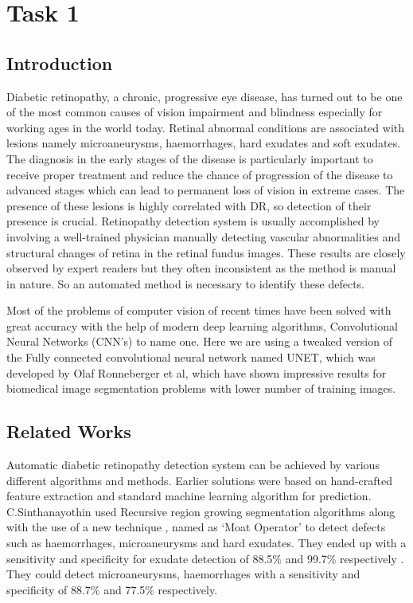 \documentclass[conference]{IEEEtran}
\begin{document}
\section{Task 1}

\subsection{Introduction}
\par
Diabetic retinopathy, a chronic, progressive eye disease, has turned out to be one of the most common causes of vision impairment and blindness especially for working ages in the world today\cite{1}. Retinal abnormal conditions are associated with lesions namely microaneurysms, haemorrhages, hard exudates and soft exudates. The diagnosis in the early stages of the disease is particularly important to receive proper treatment and reduce the chance of progression of the disease to advanced stages which can lead to permanent loss of vision in extreme cases\cite{2}. The presence of these lesions is highly correlated with DR, so detection of their presence is crucial. Retinopathy detection system is usually accomplished by involving a well-trained physician manually detecting vascular abnormalities and structural changes of retina in the retinal fundus images. These results are closely observed by expert readers but they often inconsistent as the method is manual in nature\cite{8}. So an automated method is necessary to identify these defects. 
\par
Most of the problems of computer vision of recent times have been solved with great accuracy with the help of modern deep learning algorithms, Convolutional Neural Networks (CNN's) to name one. Here we are using a tweaked version of the Fully connected convolutional neural network named UNET, which was developed by Olaf Ronneberger et al\cite{unet}, which have shown impressive results for biomedical image segmentation problems with lower number of training images.

\subsection{Related Works}
\par

Automatic diabetic retinopathy detection system can be achieved by various different algorithms and methods. Earlier solutions were based on hand-crafted feature extraction and standard machine learning algorithm for prediction\cite{3}. C.Sinthanayothin used Recursive region growing segmentation algorithms along with the use of a new technique , named as ‘Moat Operator’ to detect defects such as haemorrhages, microaneurysms and hard exudates. They ended up with a sensitivity and specificity for exudate detection of 88.5\% and 99.7\% respectively . They could detect microaneurysms, haemorrhages with a sensitivity and specificity of 88.7\% and 77.5\% respectively. 
\end{document}
